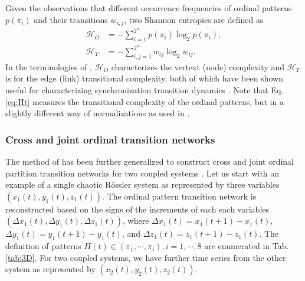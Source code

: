 		Given the observations that different occurrence frequencies of ordinal patterns $p(\pi_i)$ and their transitions $w_{i,j}$, two Shannon entropies are defined as 
		\begin{align} \label{eq:Ho}
		\mathcal{H}_O &= - \sum_{i=1}^{2^n} p(\pi_i) \log_2 p(\pi_i) , \\ \label{eq:Ht}
		\mathcal{H}_T &= - \sum_{i,j=1}^{2^{n}} w_{ij} \log_2 w_{ij}. 
		\end{align}
		In the terminologies of \cite{McCullough2017b}, $\mathcal{H}_{O}$ characterizes the vertext (node) complexity and $\mathcal{H}_{T}$ is for the edge (link) transitional complexity, both of which have been shown useful for characterizing synchronization transition dynamics \cite{Zhang2017b}. Note that Eq. \eqref{eq:Ht} measures the transitional complexity of the ordinal patterns, but in a slightly different way of normalizations as used in \cite{McCullough2017b,Small2018}. 

		\subsubsection{Cross and joint ordinal transition networks} 
		The method of \cite{Zhang2017b} has been further generalized to construct cross and joint ordinal partition transition networks for two coupled systems \cite{Guo2018}. Let us start with an example of a single chaotic R\"ossler system as represented by three variables $(x_1(t), y_1(t), z_1(t))$. The ordinal pattern transition network is reconstructed based on the signs of the increments of each each variables $(\Delta x_1(t), \Delta y_1(t), \Delta z_1(t))$, where $\Delta x_1(t) = x_1(t+1) - x_1(t)$, $\Delta y_1(t) = y_1(t+1) - y_1(t)$, and $\Delta z_1(t) = z_1(t+1) - z_1(t)$. The definition of patterns $\Pi(t) \in (\pi_1, \cdots, \pi_i), i = 1, \cdots, 8$ are enumerated in Tab. \ref{tab:3D}. For two coupled systems, we have further time series from the other system as represented by $(x_2(t), y_2(t), z_2(t))$. 
		

